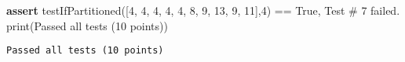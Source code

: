 \documentclass[
]{article}
\newenvironment{Shaded}{}{}
\newcommand{\BuiltInTok}[1]{\textcolor[rgb]{0.00,0.50,0.00}{#1}}
\newcommand{\ControlFlowTok}[1]{\textcolor[rgb]{0.00,0.44,0.13}{\textbf{#1}}}
\newcommand{\DecValTok}[1]{\textcolor[rgb]{0.25,0.63,0.44}{#1}}
\newcommand{\NormalTok}[1]{#1}
\newcommand{\OperatorTok}[1]{\textcolor[rgb]{0.40,0.40,0.40}{#1}}
\newcommand{\StringTok}[1]{\textcolor[rgb]{0.25,0.44,0.63}{#1}}
\newcommand{\VariableTok}[1]{\textcolor[rgb]{0.10,0.09,0.49}{#1}}
\begin{document}
\begin{Shaded}
\begin{Highlighting}[]
\ControlFlowTok{assert}\NormalTok{ testIfPartitioned([}\DecValTok{4}\NormalTok{, }\DecValTok{4}\NormalTok{, }\DecValTok{4}\NormalTok{, }\DecValTok{4}\NormalTok{, }\DecValTok{4}\NormalTok{, }\DecValTok{8}\NormalTok{, }\DecValTok{9}\NormalTok{, }\DecValTok{13}\NormalTok{, }\DecValTok{9}\NormalTok{, }\DecValTok{11}\NormalTok{],}\DecValTok{4}\NormalTok{) }\OperatorTok{==} \VariableTok{True}\NormalTok{, }\StringTok{\textquotesingle{} Test \# 7 failed.\textquotesingle{}}
\BuiltInTok{print}\NormalTok{(}\StringTok{\textquotesingle{}Passed all tests (10 points)\textquotesingle{}}\NormalTok{)}
\end{Highlighting}
\end{Shaded}

\begin{verbatim}
Passed all tests (10 points)
\end{verbatim}
\end{document}

